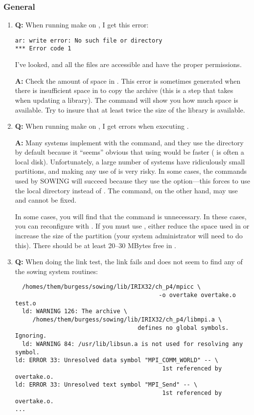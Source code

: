 \documentclass[11pt,twoside]{article}
\def\question{{\bf Q: }}
\def\answer{{\bf A: }}
\begin{document}
\subsubsection{General}
\begin{enumerate}
\item 
\question 
When running make on , I get this error:
\begin{verbatim}
ar: write error: No such file or directory
*** Error code 1
\end{verbatim}
I've looked, and all the files are accessible and have the proper permissions.

\answer 
Check the amount of space in .  This error is sometimes
generated when there is insufficient space in  to copy the archive
(this is a step that  takes when updating a library).  The command
 will show you how much space is available.  Try to insure that
at least twice the size of the library is available.

\item \question
When running make on , I get errors when executing .

\answer
Many systems implement  with the  command, and they use
the  directory by default because it ``seems'' obvious that using
 would be faster ( is often a local disk).
Unfortunately, a large number of systems have ridiculously small 
partitions, and making any use of  is very risky.  In some
cases, the  commands used by SOWING will succeed because they 
use the  option---this forces  to use the local directory 
instead of .  The  command, on the other hand, may use
 and cannot be fixed.

In some cases, you will find that the  command is unnecessary. 
In these cases, you can reconfigure with .  If you must use
, either reduce the space used in  or increase the
size of the  partition (your system administrator will need to do
this).  There should be at least 20--30 MBytes free in .

\item
\question
When doing the link test, the link fails and does not seem to find any of the
sowing system routines:
\noindent
\begin{verbatim}
  /homes/them/burgess/sowing/lib/IRIX32/ch_p4/mpicc \
                                         -o overtake overtake.o test.o 
  ld: WARNING 126: The archive \
     /homes/them/burgess/sowing/lib/IRIX32/ch_p4/libmpi.a \
                                   defines no global symbols. Ignoring.
  ld: WARNING 84: /usr/lib/libsun.a is not used for resolving any symbol.
ld: ERROR 33: Unresolved data symbol "MPI_COMM_WORLD" -- \
                                          1st referenced by overtake.o.
ld: ERROR 33: Unresolved text symbol "MPI_Send" -- \
                                          1st referenced by overtake.o.
...
\end{verbatim}


\end{enumerate}
\end{document}
